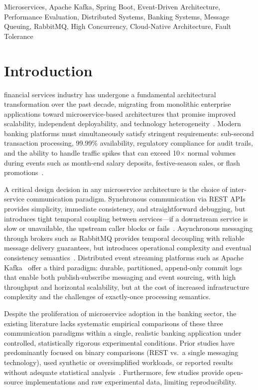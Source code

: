\documentclass[journal]{IEEEtran}
\begin{document}
\begin{IEEEkeywords}
Microservices, Apache Kafka, Spring Boot, Event-Driven Architecture, Performance Evaluation, Distributed Systems, Banking Systems, Message Queuing, RabbitMQ, High Concurrency, Cloud-Native Architecture, Fault Tolerance
\end{IEEEkeywords}

\section{Introduction}
\label{sec:introduction}

 financial services industry has undergone a fundamental architectural transformation over the past decade, migrating from monolithic enterprise applications toward microservice-based architectures that promise improved scalability, independent deployability, and technology heterogeneity~\cite{newman2015building, dragoni2017microservices}. Modern banking platforms must simultaneously satisfy stringent requirements: sub-second transaction processing, 99.99\% availability, regulatory compliance for audit trails, and the ability to handle traffic spikes that can exceed 10$\times$ normal volumes during events such as month-end salary deposits, festive-season sales, or flash promotions~\cite{cockcroft2016netflix}.

A critical design decision in any microservice architecture is the choice of inter-service communication paradigm. Synchronous communication via REST APIs provides simplicity, immediate consistency, and straightforward debugging, but introduces tight temporal coupling between services---if a downstream service is slow or unavailable, the upstream caller blocks or fails~\cite{richardson2018microservices}. Asynchronous messaging through brokers such as RabbitMQ provides temporal decoupling with reliable message delivery guarantees, but introduces operational complexity and eventual consistency semantics~\cite{videla2012rabbitmq}. Distributed event streaming platforms such as Apache Kafka~\cite{kreps2011kafka} offer a third paradigm: durable, partitioned, append-only commit logs that enable both publish-subscribe messaging and event sourcing, with high throughput and horizontal scalability, but at the cost of increased infrastructure complexity and the challenges of exactly-once processing semantics.

Despite the proliferation of microservice adoption in the banking sector, the existing literature lacks systematic empirical comparisons of these three communication paradigms within a single, realistic banking application under controlled, statistically rigorous experimental conditions. Prior studies have predominantly focused on binary comparisons (REST vs.\ a single messaging technology), used synthetic or oversimplified workloads, or reported results without adequate statistical analysis~\cite{villamizar2015infrastructure, al2016comparison}. Furthermore, few studies provide open-source implementations and raw experimental data, limiting reproducibility.
\end{document}
